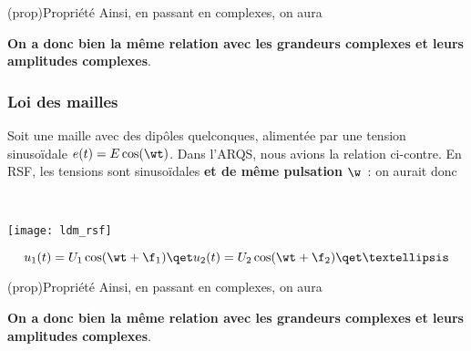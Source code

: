 \documentclass[../../main/main.tex]{subfiles}
\begin{document}
\begin{tcb}(prop){Propriété}
	Ainsi, en passant en complexes, on aura
	\begin{center}
		\textbf{On a donc bien la même relation avec les grandeurs complexes et
			leurs amplitudes complexes}.
	\end{center}
\end{tcb}

\subsubsection{Loi des mailles}
\noindent
\begin{minipage}[t]{.48\linewidth}
	Soit une maille avec des dipôles quelconques, alimentée par une tension
	sinusoïdale $e(t) = E\cos(\wt)$. Dans l'ARQS, nous avions la relation ci-contre.
	En RSF, les tensions sont sinusoïdales \textbf{et de même pulsation} $\w$~: on
	aurait donc
\end{minipage}
\hfill
\begin{minipage}[t]{.48\linewidth}
	~
	\vspace{-40pt}
	\begin{center}
		\texttt{[image: ldm\_rsf]}
	\end{center}
\end{minipage}
\[
	u_1(t) = U_1\cos(\wt+\f_1)
	\qet
	u_2(t) = U_2\cos(\wt+\f_2)
	\qet
	…
\]

\begin{tcb}(prop){Propriété}
	Ainsi, en passant en complexes, on aura
	\begin{center}
		\textbf{On a donc bien la même relation avec les grandeurs complexes et
			leurs amplitudes complexes}.
	\end{center}
\end{tcb}
\end{document}
